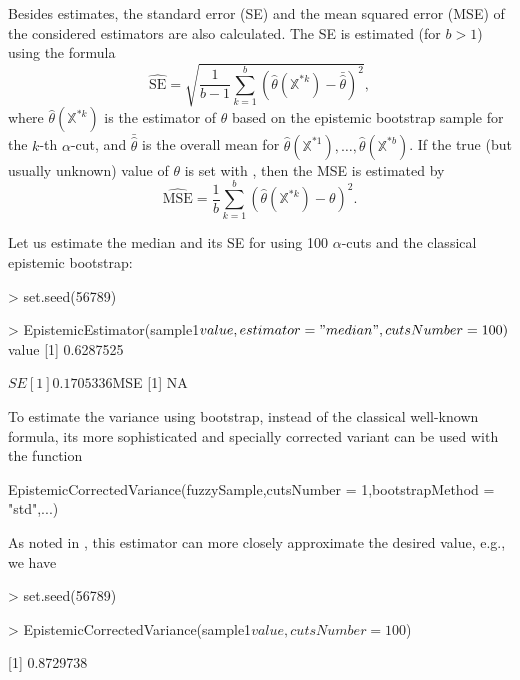 Besides estimates, the standard error (SE) and the mean squared error (MSE) of the considered estimators are also calculated.
The SE is estimated (for $b >1$) using the formula
\begin{equation}
\label{frachetse}
	\widehat{\mathrm{SE}}=\sqrt{\frac{1}{b-1} \sum_{k=1}^{b} \left ( \hat{\theta} \left (\mathbb{X}^{*k} \right) - \bar{\hat{\theta}} \right )^2}  ,
\end{equation}
where $\hat{\theta} \left (\mathbb{X}^{*k} \right) $ is the estimator of $\theta$ based on the epistemic bootstrap sample for the $k$-th $\alpha$-cut, and $\bar{\hat{\theta}}$ is the overall mean for $\hat{\theta} \left (\mathbb{X}^{*1} \right),\ldots,\hat{\theta} \left (\mathbb{X}^{*b} \right)$.
If the true (but usually unknown) value of $\theta$ is set with , then the MSE is estimated by
\begin{equation}
\label{frachetmse}
	\widehat{\mathrm{MSE}}=\frac{1}{b} \sum_{k=1}^{b} \left ( \hat{\theta} \left (\mathbb{X}^{*k} \right) - \theta \right )^2 .
\end{equation}

Let us estimate the median and its SE for  using 100 $\alpha$-cuts and the classical epistemic bootstrap:
\begin{example}
> set.seed(56789)

> EpistemicEstimator(sample1$value, estimator = "median",cutsNumber = 100)

$value
[1] 0.6287525

$SE
[1] 0.1705336

$MSE
[1] NA
\end{example}

To estimate the variance using bootstrap, instead of the classical well-known formula, its more sophisticated and specially corrected variant \citep{pgmr2022} can be used with the function
\begin{example}
EpistemicCorrectedVariance(fuzzySample,cutsNumber = 1,bootstrapMethod = "std",...)
\end{example}
As noted in \cite{pgmr2022}, this estimator can more closely approximate the desired value, e.g., we have
\begin{example}
> set.seed(56789)

> EpistemicCorrectedVariance(sample1$value, cutsNumber = 100$)

[1] 0.8729738
\end{example}




